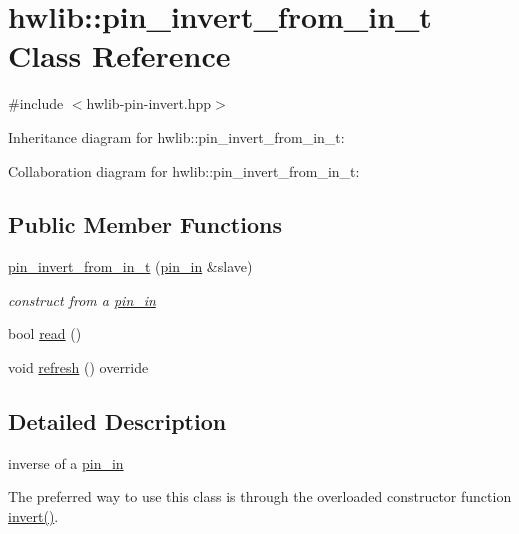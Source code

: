 \hypertarget{classhwlib_1_1pin__invert__from__in__t}{}\section{hwlib\+:\+:pin\+\_\+invert\+\_\+from\+\_\+in\+\_\+t Class Reference}
\label{classhwlib_1_1pin__invert__from__in__t}


{\ttfamily \#include $<$hwlib-\/pin-\/invert.\+hpp$>$}



Inheritance diagram for hwlib\+:\+:pin\+\_\+invert\+\_\+from\+\_\+in\+\_\+t\+:


Collaboration diagram for hwlib\+:\+:pin\+\_\+invert\+\_\+from\+\_\+in\+\_\+t\+:
\subsection*{Public Member Functions}
\begin{DoxyCompactItemize}
\item 
\mbox{\label{classhwlib_1_1pin__invert__from__in__t_affe4424d2548f8f72f691b1bf904ac06}} 
\hyperlink{classhwlib_1_1pin__invert__from__in__t_affe4424d2548f8f72f691b1bf904ac06}{pin\+\_\+invert\+\_\+from\+\_\+in\+\_\+t} (\hyperlink{classhwlib_1_1pin__in}{pin\+\_\+in} \&slave)
\begin{DoxyCompactList}\small\item\em construct from a \hyperlink{classhwlib_1_1pin__in}{pin\+\_\+in} \end{DoxyCompactList}\item 
bool \hyperlink{classhwlib_1_1pin__invert__from__in__t_a41050e62292c67a287bbd9fbce004b45}{read} ()
\item 
void \hyperlink{classhwlib_1_1pin__invert__from__in__t_a6361c3508dd5b7abcc4f6b4953710f95}{refresh} () override
\end{DoxyCompactItemize}


\subsection{Detailed Description}
inverse of a \hyperlink{classhwlib_1_1pin__in}{pin\+\_\+in}

The preferred way to use this class is through the overloaded constructor function \hyperlink{namespacehwlib_ab619d7f70bb62112b2a04192f5103a24}{invert()}. 

